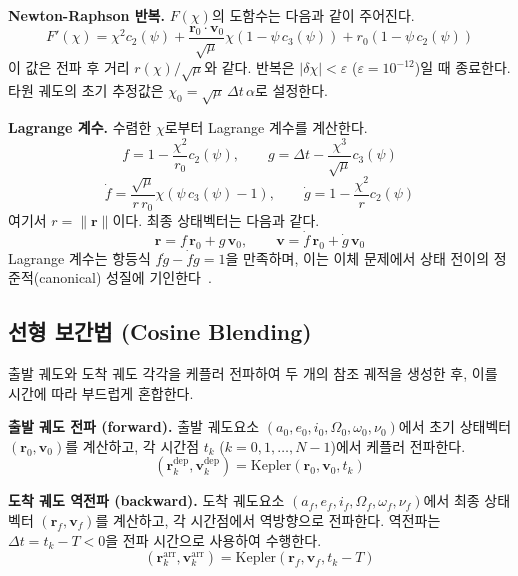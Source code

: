 \documentclass[11pt]{article}
\begin{document}
\textbf{Newton-Raphson 반복.}
$F(\chi)$의 도함수는 다음과 같이 주어진다.
\[
F'(\chi) = \chi^2 c_2(\psi) + \frac{\mathbf{r}_0 \cdot \mathbf{v}_0}{\sqrt{\mu}} \chi (1 - \psi\, c_3(\psi)) + r_0 (1 - \psi\, c_2(\psi))
\]
이 값은 전파 후 거리 $r(\chi)/\sqrt{\mu}$와 같다. 반복은 $|\delta\chi| < \varepsilon$ ($\varepsilon = 10^{-12}$)일 때 종료한다.
타원 궤도의 초기 추정값은 $\chi_0 = \sqrt{\mu}\,\Delta t\,\alpha$로 설정한다.

\textbf{Lagrange 계수.}
수렴한 $\chi$로부터 Lagrange 계수를 계산한다.
\[
f = 1 - \frac{\chi^2}{r_0} c_2(\psi), \qquad
g = \Delta t - \frac{\chi^3}{\sqrt{\mu}} c_3(\psi)
\]
\[
\dot{f} = \frac{\sqrt{\mu}}{r\,r_0} \chi (\psi\, c_3(\psi) - 1), \qquad
\dot{g} = 1 - \frac{\chi^2}{r} c_2(\psi)
\]
여기서 $r = \|\mathbf{r}\|$이다. 최종 상태벡터는 다음과 같다.
\[
\mathbf{r} = f\,\mathbf{r}_0 + g\,\mathbf{v}_0, \qquad
\mathbf{v} = \dot{f}\,\mathbf{r}_0 + \dot{g}\,\mathbf{v}_0
\]
Lagrange 계수는 항등식 $f\dot{g} - \dot{f}g = 1$을 만족하며,
이는 이체 문제에서 상태 전이의 정준적(canonical) 성질에 기인한다~\cite{Curtis2020}.


\subsection{선형 보간법 (Cosine Blending)}
\label{sec:cosine_blending}

출발 궤도와 도착 궤도 각각을 케플러 전파하여 두 개의 참조 궤적을 생성한 후, 이를 시간에 따라 부드럽게 혼합한다.

\textbf{출발 궤도 전파 (forward).}
출발 궤도요소 $(a_0, e_0, i_0, \Omega_0, \omega_0, \nu_0)$에서 초기 상태벡터 $(\mathbf{r}_0, \mathbf{v}_0)$를 계산하고,
각 시간점 $t_k$ ($k = 0, 1, \ldots, N-1$)에서 케플러 전파한다.
\[
(\mathbf{r}_k^{\text{dep}}, \mathbf{v}_k^{\text{dep}}) = \text{Kepler}(\mathbf{r}_0, \mathbf{v}_0, t_k)
\]

\textbf{도착 궤도 역전파 (backward).}
도착 궤도요소 $(a_f, e_f, i_f, \Omega_f, \omega_f, \nu_f)$에서 최종 상태벡터 $(\mathbf{r}_f, \mathbf{v}_f)$를 계산하고,
각 시간점에서 역방향으로 전파한다. 역전파는 $\Delta t = t_k - T < 0$을 전파 시간으로 사용하여 수행한다.
\[
(\mathbf{r}_k^{\text{arr}}, \mathbf{v}_k^{\text{arr}}) = \text{Kepler}(\mathbf{r}_f, \mathbf{v}_f, t_k - T)
\]
\end{document}
